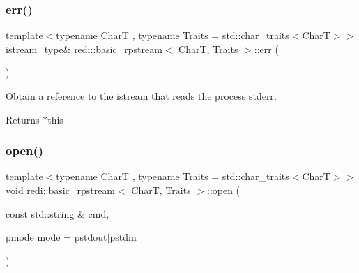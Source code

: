 \subsubsection{\texorpdfstring{err()}{err()}}
{\footnotesize\ttfamily template$<$typename CharT , typename Traits  = std\+::char\+\_\+traits$<$\+Char\+T$>$$>$ \\
istream\+\_\+type\& \mbox{\hyperlink{classredi_1_1basic__rpstream}{redi\+::basic\+\_\+rpstream}}$<$ CharT, Traits $>$\+::err (\begin{DoxyParamCaption}{ }\end{DoxyParamCaption})\hspace{0.3cm}{\ttfamily [inline]}}



Obtain a reference to the istream that reads the process\textquotesingle{} {\ttfamily stderr}. 

\begin{DoxyReturn}{Returns}
{\ttfamily $\ast$this} 
\end{DoxyReturn}
\mbox{\label{classredi_1_1basic__rpstream_a6f9d538dbcf3201f7be7638f5f389816}} 
\subsubsection{\texorpdfstring{open()}{open()}\hspace{0.1cm}{\footnotesize\ttfamily [1/2]}}
{\footnotesize\ttfamily template$<$typename CharT , typename Traits  = std\+::char\+\_\+traits$<$\+Char\+T$>$$>$ \\
void \mbox{\hyperlink{classredi_1_1basic__rpstream}{redi\+::basic\+\_\+rpstream}}$<$ CharT, Traits $>$\+::open (\begin{DoxyParamCaption}\item[{const std\+::string \&}]{cmd,  }\item[{\mbox{\hyperlink{structredi_1_1pstreams_a1eae4aad88812af03a0fbb3ec13c50b7}{pmode}}}]{mode = {\ttfamily \mbox{\hyperlink{structredi_1_1pstreams_ad3c6d53a98de4566478b1c40c101a42b}{pstdout}}$\vert$\mbox{\hyperlink{structredi_1_1pstreams_a7a976ce992db857f86a0cc3352e42d3a}{pstdin}}} }\end{DoxyParamCaption})\hspace{0.3cm}{\ttfamily [inline]}}



